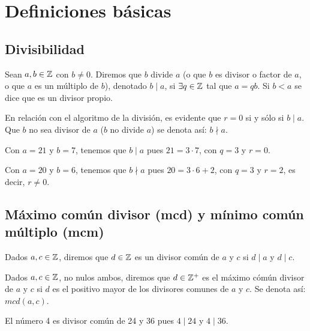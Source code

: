 \section{Definiciones básicas}

\subsection{Divisibilidad}
\begin{definicion}[Divisibilidad]\label{def:divisibilidad}
Sean $a, b \in \mathbb{Z}$ con $b \neq 0$. 
Diremos que $b$ divide $a$ (o que $b$ es divisor o factor de $a$, o que $a$ es un múltiplo de $b$), denotado $b \mid a$, si $\exists q \in \mathbb{Z}$ tal que $a = qb$. Si $b<a$ se dice que es un divisor propio.
\end{definicion}

En relación con el algoritmo de la división, es evidente que $r = 0$ si y sólo si $b \mid a$. \\
Que $b$ no sea divisor de $a$ ($b$ no divide $a$) se denota así: $b \nmid a$.

\begin{ejemplo}
Con $a = 21$ y $b = 7$, tenemos que $b \mid a$ pues $21 = 3 \cdot 7$, con $q = 3$ y $r = 0$.
\end{ejemplo}

\begin{ejemplo}
Con $a = 20$ y $b = 6$, tenemos que $b \nmid a$ pues $20 = 3 \cdot 6 + 2$, con $q = 3$ y $r = 2$, es decir, $r \neq 0$.
\end{ejemplo}

\subsection{Máximo común divisor (mcd) y mínimo común múltiplo (mcm)}
\begin{definicion}\label{def:divComun}
Dados $a,c \in \mathbb{Z}$, diremos que $d \in \mathbb{Z}$ es un divisor común de $a$ y $c$ si $d \mid a$ y $d \mid c$.
\end{definicion}

\begin{definicion}[mcd]\label{def:mcd}
Dados $a,c \in \mathbb{Z}$, no nulos ambos, diremos que $d \in \mathbb{Z}^{+}$ es el máximo cómún divisor de $a$ y $c$ si $d$ es el positivo mayor de los divisores comunes de $a$ y $c$. 
Se denota así: $mcd(a,c)$.
\end{definicion}

\begin{ejemplo}
El número 4 es divisor común de 24 y 36 pues $4 \mid 24$ \; y \; $4 \mid 36$.
\end{ejemplo}

